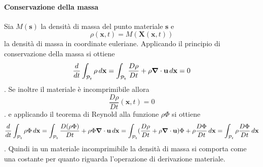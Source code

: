 \paragraph{Conservazione della massa}
Sia $M(\mathbf{s})$ la densità di massa del punto materiale $\mathbf{s}$ e 
$$\rho(\mathbf{x},t)=M(\mathbf{X}(\mathbf{x},t))$$
la densità di massa in coordinate euleriane.
Applicando il principio di conservazione della massa si ottiene
$$\frac{d}{dt}\int_{\mathcal{P}_t}\rho\,d\mathbf{x}=\int_{\mathcal{P}_t}\frac{D\rho}{Dt}+\rho\boldsymbol{\nabla}\cdot\mathbf{u}\,d\mathbf{x}=0$$.
Se inoltre il materiale è incomprimibile allora 
$$\frac{D\rho}{Dt}(\mathbf{x},t)=0 $$.
e applicando il teorema di Reynold alla funzione $\rho\Phi$ si ottiene
$$\frac{d}{dt}\int_{\mathcal{P}_t}\rho\Phi\,d\mathbf{x}=\int_{\mathcal{P}_t}\frac{D(\rho\Phi)}{Dt}+\rho\Phi\boldsymbol{\nabla}\cdot\mathbf{u}\,d\mathbf{x}=\int_{\mathcal{P}_t}(\frac{D\rho}{Dt}+\rho\boldsymbol{\nabla}\cdot\mathbf{u})\Phi+\rho\frac{D\Phi}{Dt}\,d\mathbf{x}=\int_{\mathcal{P}_t}\rho\frac{D\Phi}{Dt}\,d\mathbf{x}$$.
Quindi in un materiale incomprimibile la densità di massa si comporta come una costante per quanto riguarda l'operazione di derivazione materiale.

